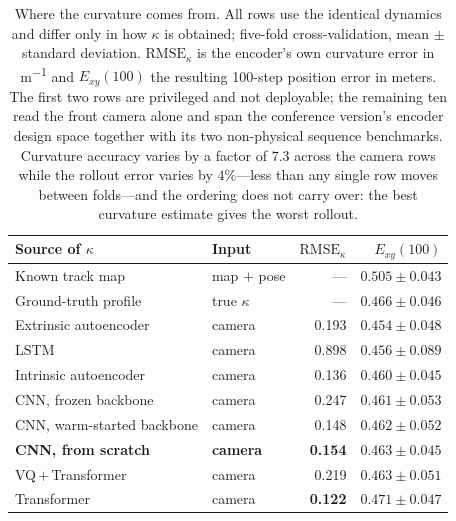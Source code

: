 \documentclass[preprint,12pt]{elsarticle}
\begin{document}
\begin{table}[t]
\centering
\caption{Where the curvature comes from. All rows use the identical dynamics and
differ only in how $\kappa$ is obtained; five-fold cross-validation, mean $\pm$ standard deviation. $\mathrm{RMSE}_\kappa$ is the encoder's own curvature error in
\si{m^{-1}} and $E_{xy}(100)$ the resulting 100-step position error in meters. The
first two rows are privileged and not deployable; the remaining ten read the front
camera alone and span the conference version's encoder design space together with
its two non-physical sequence benchmarks. Curvature accuracy varies by a factor of
$7.3$ across the camera rows while the rollout error varies by $4\%$---less than any
single row moves between folds---and the ordering does not carry over: the best
curvature estimate gives the worst rollout.}
\label{tab:kappa_source}
\footnotesize
\setlength{\tabcolsep}{4.5pt}
\begin{tabular}{llrr}
\toprule
Source of $\kappa$ & Input & $\mathrm{RMSE}_\kappa$ & $E_{xy}(100)$ \\
\midrule
Known track map            & map $+$ pose  & ---   & $0.505 \pm 0.043$ \\
Ground-truth profile       & true $\kappa$ & ---   & $0.466 \pm 0.046$ \\
\midrule
Extrinsic autoencoder      & camera & 0.193 & $\mathbf{0.454 \pm 0.048}$ \\
LSTM                       & camera & 0.898 & $0.456 \pm 0.089$ \\
Intrinsic autoencoder      & camera & 0.136 & $0.460 \pm 0.045$ \\
CNN, frozen backbone       & camera & 0.247 & $0.461 \pm 0.053$ \\
CNN, warm-started backbone & camera & 0.148 & $0.462 \pm 0.052$ \\
\textbf{CNN, from scratch} & \textbf{camera} & \textbf{0.154} & $\mathbf{0.463 \pm 0.045}$ \\
VQ\,$+$\,Transformer       & camera & 0.219 & $0.463 \pm 0.051$ \\
Transformer                & camera & \textbf{0.122} & $0.471 \pm 0.047$ \\
\bottomrule
\end{tabular}
\end{table}
\end{document}
